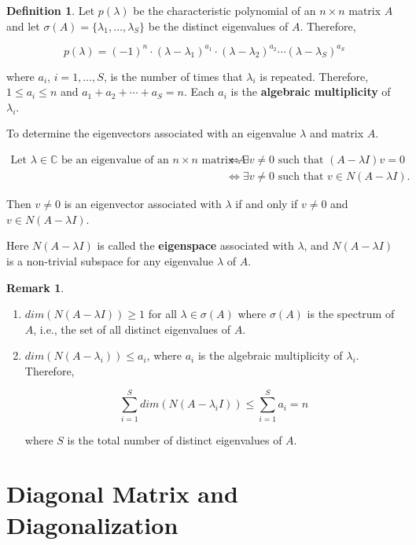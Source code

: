 \documentclass[12pt]{article}
\theoremstyle{definition}
\newtheorem*{definition}{Definition}
\newtheorem*{remark}{Remark}
\begin{document}
\begin{definition}
Let $p(\lambda)$ be the characteristic polynomial of an $n \times n$ matrix $A$ and let $\sigma(A) =
\{\lambda_1, \ldots, \lambda_S \}$ be the distinct eigenvalues of $A$. Therefore,

\[ p(\lambda) = (-1)^n \cdot (\lambda - \lambda_1)^{a_1} \cdot (\lambda - \lambda_2)^{a_2} \cdots
(\lambda - \lambda_S)^{a_S} \]

where $a_i$, $i = 1, \ldots, S$, is the number of times that $\lambda_i$ is repeated. Therefore,
$1 \leq a_i \leq n$ and $a_1 + a_2 + \cdots + a_S = n$. Each $a_i$ is the \textbf{algebraic 
multiplicity} of $\lambda_i$.
\end{definition}

\noindent To determine the eigenvectors associated with an eigenvalue $\lambda$ and matrix $A$.

\begin{align*}
\text{Let } \lambda \in \mathbb{C} \text{ be an eigenvalue of an } n \times n \text{ matrix } A &\iff
\exists v \neq 0 \text{ such that } (A - \lambda I)v = 0 \\
&\iff \exists v \neq 0 \text{ such that } v \in N(A - \lambda I). 
\end{align*}

Then $v \neq 0$ is an eigenvector associated with $\lambda$ if and only if $v \neq 0$ and
$v \in N(A - \lambda I)$.

Here $N(A - \lambda I)$ is called the \textbf{eigenspace} associated with $\lambda$, and 
$N(A - \lambda I)$ is a non-trivial subspace for any eigenvalue $\lambda$ of $A$.

\begin{remark} $ $
\begin{enumerate}[label = (\arabic*)]
\item $dim(N(A - \lambda I)) \geq 1$ for all $\lambda \in \sigma(A)$ where $\sigma(A)$ is the
spectrum of $A$, i.e., the set of all distinct eigenvalues of $A$.

\item $dim(N(A - \lambda_i )) \leq a_i$, where $a_i$ is the algebraic multiplicity of $\lambda_i$.
Therefore,

\[ \sum_{i = 1}^{S} dim(N(A - \lambda_i I)) \leq \sum_{i = 1}^{S} a_i = n \]

where $S$ is the total number of distinct eigenvalues of $A$.
\end{enumerate}
\end{remark} 

\section{Diagonal Matrix and Diagonalization}
\end{document}
